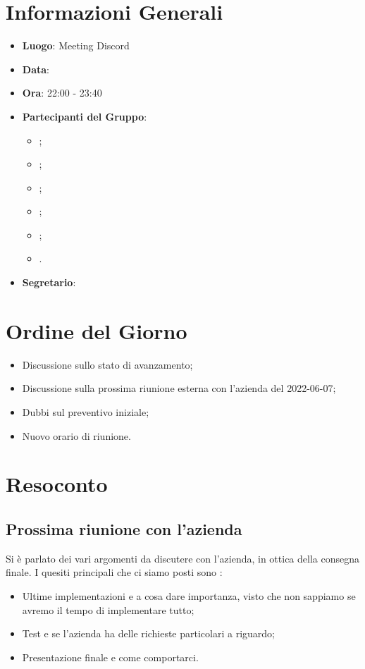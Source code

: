 \section{Informazioni Generali}

\begin{itemize}
	\item{\textbf{Luogo}}: Meeting Discord
	\item{\textbf{Data}}: \D
	\item{\textbf{Ora}}: 22:00 - 23:40
	\item{\textbf{Partecipanti del Gruppo}}:
	\begin{itemize}
		\item{\FP{};}
		\item{\GC{};}
		\item{\LW{};}
  		\item {\MB{};}
		\item{\MG{};}
		\item{\PV{}.}
	\end{itemize}
	\item{\textbf{Segretario}}: \PV{}
\end{itemize}

\section{Ordine del Giorno}
\begin{itemize}
	\item{Discussione sullo stato di avanzamento;}
	\item{Discussione sulla prossima riunione esterna con l'azienda del 2022-06-07;}
 	\item{Dubbi sul preventivo iniziale;} 
	\item {Nuovo orario di riunione.}
\end{itemize}

\section{Resoconto}
 

\subsection{Prossima riunione con l'azienda}
Si è parlato dei vari argomenti da discutere con l'azienda, in ottica della consegna finale. I quesiti principali che ci siamo posti sono : 
\begin{itemize}
	\item Ultime implementazioni e a cosa dare importanza, visto che non sappiamo se avremo il tempo di implementare tutto;
 	\item Test e se l'azienda ha delle richieste particolari a riguardo;
  	\item Presentazione finale e come comportarci.
\end{itemize}


